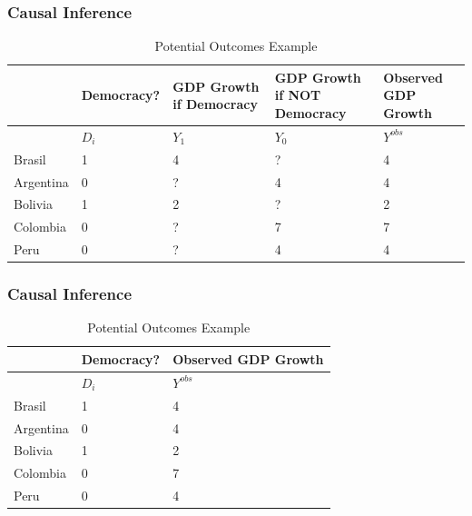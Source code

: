 \documentclass[xcolor=x11names,compress]{beamer}\usepackage[]{graphicx}\usepackage[]{color}
\renewcommand{\(}{\begin{columns}}
\renewcommand{\)}{\end{columns}}
\newcommand{\<}[1]{\begin{column}{#1}}
\renewcommand{\>}{\end{column}}
\begin{document}
\begin{frame}
\frametitle{Causal Inference}
\footnotesize
\begin{table}[htbp]
  \centering
  \caption{Potential Outcomes Example}
    \begin{tabular}{|p{1.8cm}|p{1.8cm}|p{2cm}|p{2cm}|p{2cm}|}
    \hline
          & \multicolumn{1}{p{1.8cm}|}{Democracy?} & \multicolumn{1}{p{2cm}|}{GDP Growth if Democracy} & \multicolumn{1}{p{2.2cm}|}{GDP Growth if NOT Democracy} & \textbf{Observed} GDP Growth \bigstrut\\
    \hline
          & \multicolumn{1}{p{1.8cm}|}{$D_i$} & \multicolumn{1}{p{2cm}|}{$Y_1$} & \multicolumn{1}{p{2.2cm}|}{$Y_0$} & \multicolumn{1}{p{1.8cm}|}{$Y^{obs}$} \bigstrut\\
    \hline
    Brasil & 1 & 4     & ?      & 4 \bigstrut\\
    \hline
    Argentina & 0 & ?    & 4      & 4 \bigstrut\\
    \hline
    Bolivia & 1 & 2     & ?     & 2 \bigstrut\\
    \hline
    Colombia & 0 &  ?   & 7    & 7 \bigstrut\\
    \hline
    Peru & 0 & ?     & 4     & 4 \bigstrut\\
    \hline
    \end{tabular}%
  \label{tab:addlabel}%
\end{table}%
\normalsize
\end{frame}

\begin{frame}
\frametitle{Causal Inference}
\footnotesize
\begin{table}[htbp]
  \centering
  \caption{Potential Outcomes Example}
    \begin{tabular}{|p{1.8cm}|p{1.8cm}|p{2cm}|}
    \hline
          & \multicolumn{1}{p{1.8cm}|}{Democracy?} & \textbf{Observed} GDP Growth \bigstrut\\
    \hline
          & \multicolumn{1}{p{1.8cm}|}{$D_i$} & \multicolumn{1}{p{1.8cm}|}{$Y^{obs}$} \bigstrut\\
    \hline
    Brasil & 1 & 4 \bigstrut\\
    \hline
    Argentina & 0      & 4 \bigstrut\\
    \hline
    Bolivia & 1      & 2 \bigstrut\\
    \hline
    Colombia & 0    & 7 \bigstrut\\
    \hline
    Peru & 0 & 4 \bigstrut\\
    \hline
    \end{tabular}%
  \label{tab:addlabel}%
\end{table}%
\normalsize
\end{frame}
\end{document}
